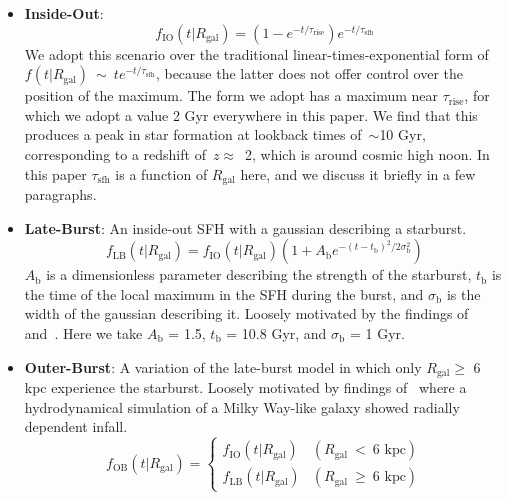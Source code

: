 \documentclass[a4paper, fleqn, usenatbib, useAMS]{mnras}
\begin{document}
\begin{itemize}
\begin{itemize}
		\item \textbf{Inside-Out}: 
		\begin{equation} 
		f_\text{IO}(t|R_\text{gal}) = (1 - e^{-t/\tau_\text{rise}})
		e^{-t/\tau_\text{sfh}} 
		\label{eq:insideout_sfh} 
		\end{equation} 
		We adopt this scenario over the traditional linear-times-exponential 
		form of $f(t|R_\text{gal})~\sim~te^{-t/\tau_\text{sfh}}$, because the 
		latter does not offer control over the position of the maximum. The 
		form we adopt has a maximum near $\tau_\text{rise}$, for which we adopt 
		a value 2 Gyr everywhere in this paper. We find that this produces a 
		peak in star formation at lookback times of~$\sim$10 Gyr, corresponding 
		to a redshift of~$z \approx$~2, which is around cosmic high noon. In 
		this paper $\tau_\text{sfh}$ is a function of $R_\text{gal}$ here, and 
		we discuss it briefly in a few paragraphs. 

		\item \textbf{Late-Burst}: An inside-out SFH with a gaussian describing 
		a starburst. 
		\begin{equation} 
		f_\text{LB}(t|R_\text{gal}) = f_\text{IO}(t|R_\text{gal}) 
		(1 + A_\text{b}e^{-(t - t_\text{b})^2/2\sigma_\text{b}^2}) 
		\label{eq:lateburst_sfh} 
		\end{equation} 
		$A_\text{b}$ is a dimensionless parameter describing the strength of 
		the starburst, $t_\text{b}$ is the time of the local maximum in the SFH 
		during the burst, and $\sigma_\text{b}$ is the width of the gaussian 
		describing it. Loosely motivated by the findings of~\citet{Isern2019} 
		and~\citet{Mor2019}. Here we take $A_\text{b}$ = 1.5, $t_\text{b}$ = 
		10.8 Gyr, and $\sigma_\text{b}$ = 1 Gyr. 

		\item \textbf{Outer-Burst}: A variation of the late-burst model in 
		which only $R_\text{gal}\geq$ 6 kpc experience the starburst. Loosely 
		motivated by findings of~\citet{Vincenzo2020} where a hydrodynamical 
		simulation of a Milky Way-like galaxy showed radially dependent 
		infall. 
		\begin{equation} 
		f_\text{OB}(t|R_\text{gal}) = \begin{cases} 
		f_\text{IO}(t|R_\text{gal}) & (R_\text{gal}~<~\text{6 kpc}) \\ 
		f_\text{LB}(t|R_\text{gal}) & (R_\text{gal}~\geq~\text{6 kpc}) 
		\end{cases} 
		\label{eq:outerburst_sfh} 
		\end{equation} 
	\end{itemize} 


\end{itemize}
\end{document}
